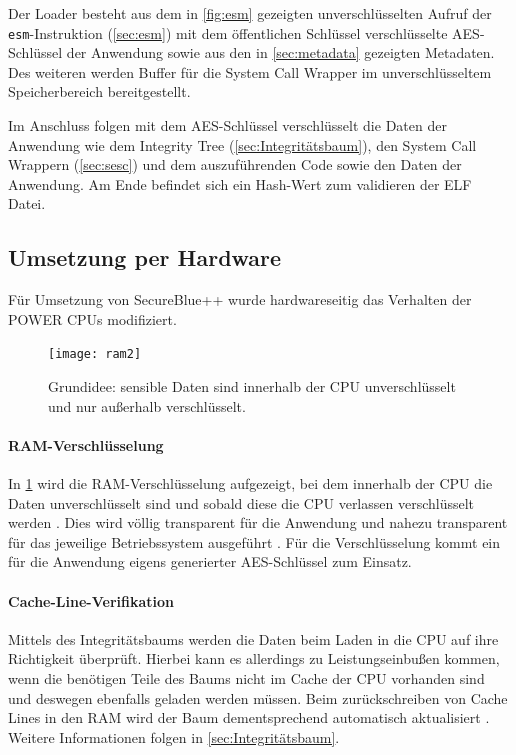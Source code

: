 \documentclass[ngerman]{sig-alternate-05-2015}
\begin{document}
Der Loader besteht aus dem in \cref{fig:esm} gezeigten unverschlüsselten Aufruf der \texttt{esm}-Instruktion (\cref{sec:esm}) mit dem öffentlichen Schlüssel verschlüsselte AES-Schlüssel der Anwendung sowie aus den in \cref{sec:metadata} gezeigten Metadaten. Des weiteren werden Buffer für die System Call Wrapper im unverschlüsseltem Speicherbereich bereitgestellt.

Im Anschluss folgen mit dem AES-Schlüssel verschlüsselt die Daten der Anwendung wie dem Integrity Tree (\cref{sec:Integritätsbaum}), den System Call Wrappern (\cref{sec:sesc}) und dem auszuführenden Code sowie den Daten der Anwendung. Am Ende befindet sich ein Hash-Wert zum validieren der ELF Datei.

\subsection{Umsetzung per Hardware}
Für Umsetzung von SecureBlue++ wurde hardwareseitig das Verhalten der POWER CPUs modifiziert.

\begin{figure}
	\centering
	\texttt{[image: ram2]}
	\caption{Grundidee: sensible Daten sind innerhalb der CPU unverschlüsselt und nur außerhalb verschlüsselt. \cite{boivie2013secureblue++:big}}
	\label{fig:ram}
\end{figure}
\paragraph{RAM-Verschlüsselung} In \cref{fig:ram} wird die RAM-Verschlüsselung aufgezeigt, bei dem innerhalb der CPU die Daten unverschlüsselt sind und sobald diese die CPU verlassen verschlüsselt werden \cite{secureblue++patent}. Dies wird völlig transparent für die Anwendung und nahezu transparent für das jeweilige Betriebssystem ausgeführt \cite{boivie2013secureblue++:big}. Für die Verschlüsselung kommt ein für die Anwendung eigens generierter AES-Schlüssel zum Einsatz. 

\paragraph{Cache-Line-Verifikation} Mittels des Integritätsbaums werden die Daten beim Laden in die CPU auf ihre Richtigkeit überprüft. Hierbei kann es allerdings zu Leistungseinbußen kommen, wenn die benötigen Teile des Baums nicht im Cache der CPU vorhanden sind und deswegen ebenfalls geladen werden müssen. Beim zurückschreiben von Cache Lines in den RAM wird der Baum dementsprechend automatisch aktualisiert \cite{boivie2013secureblue++:big}. Weitere Informationen folgen in \cref{sec:Integritätsbaum}.
\end{document}

